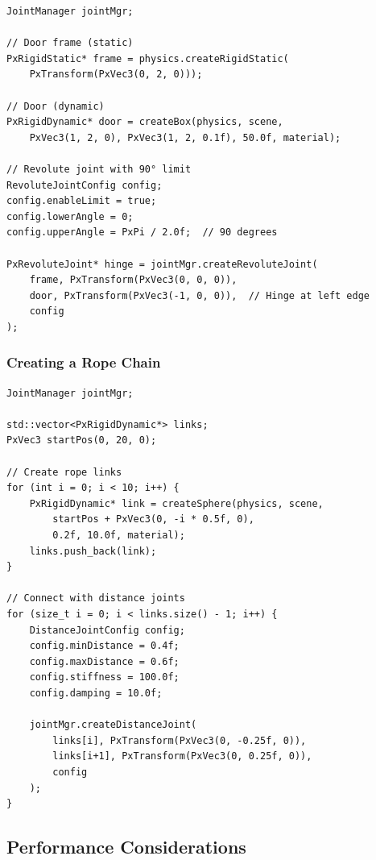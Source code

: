 \begin{lstlisting}[caption={Door with revolute joint}]
JointManager jointMgr;

// Door frame (static)
PxRigidStatic* frame = physics.createRigidStatic(
    PxTransform(PxVec3(0, 2, 0)));

// Door (dynamic)
PxRigidDynamic* door = createBox(physics, scene,
    PxVec3(1, 2, 0), PxVec3(1, 2, 0.1f), 50.0f, material);

// Revolute joint with 90° limit
RevoluteJointConfig config;
config.enableLimit = true;
config.lowerAngle = 0;
config.upperAngle = PxPi / 2.0f;  // 90 degrees

PxRevoluteJoint* hinge = jointMgr.createRevoluteJoint(
    frame, PxTransform(PxVec3(0, 0, 0)),
    door, PxTransform(PxVec3(-1, 0, 0)),  // Hinge at left edge
    config
);
\end{lstlisting}

\subsubsection{Creating a Rope Chain}

\begin{lstlisting}[caption={Rope using distance joints}]
JointManager jointMgr;

std::vector<PxRigidDynamic*> links;
PxVec3 startPos(0, 20, 0);

// Create rope links
for (int i = 0; i < 10; i++) {
    PxRigidDynamic* link = createSphere(physics, scene,
        startPos + PxVec3(0, -i * 0.5f, 0),
        0.2f, 10.0f, material);
    links.push_back(link);
}

// Connect with distance joints
for (size_t i = 0; i < links.size() - 1; i++) {
    DistanceJointConfig config;
    config.minDistance = 0.4f;
    config.maxDistance = 0.6f;
    config.stiffness = 100.0f;
    config.damping = 10.0f;

    jointMgr.createDistanceJoint(
        links[i], PxTransform(PxVec3(0, -0.25f, 0)),
        links[i+1], PxTransform(PxVec3(0, 0.25f, 0)),
        config
    );
}
\end{lstlisting}


\subsection{Performance Considerations}

